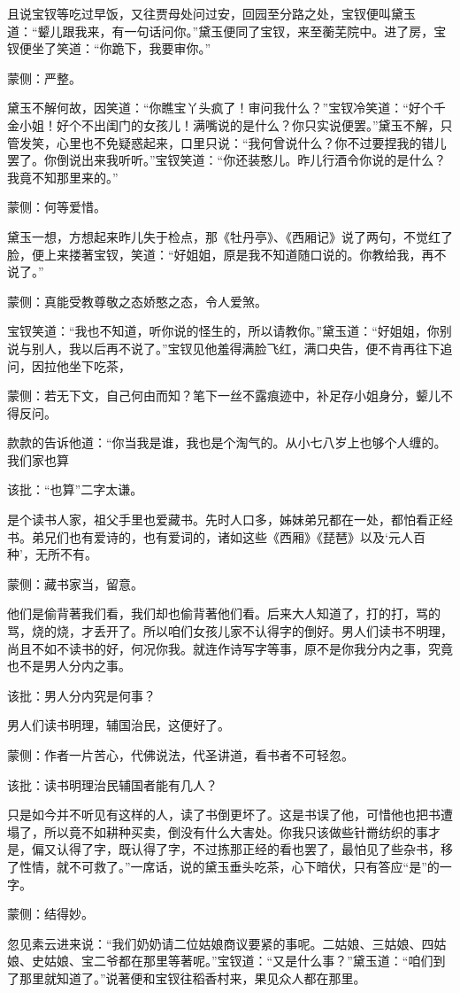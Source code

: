 \begin{parag}
    且说宝钗等吃过早饭，又往贾母处问过安，回园至分路之处，宝钗便叫黛玉道：“颦儿跟我来，有一句话问你。”黛玉便同了宝钗，来至蘅芜院中。进了房，宝钗便坐了笑道：“你跪下，我要审你。”\begin{note}蒙侧：严整。\end{note}黛玉不解何故，因笑道：“你瞧宝丫头疯了！审问我什么？”宝钗冷笑道：“好个千金小姐！好个不出闺门的女孩儿！满嘴说的是什么？你只实说便罢。”黛玉不解，只管发笑，心里也不免疑惑起来，口里只说：“我何曾说什么？你不过要捏我的错儿罢了。你倒说出来我听听。”宝钗笑道：“你还装憨儿。昨儿行酒令你说的是什么？我竟不知那里来的。”\begin{note}蒙侧：何等爱惜。\end{note}黛玉一想，方想起来昨儿失于检点，那《牡丹亭》、《西厢记》说了两句，不觉红了脸，便上来搂著宝钗，笑道：“好姐姐，原是我不知道随口说的。你教给我，再不说了。”\begin{note}蒙侧：真能受教尊敬之态娇憨之态，令人爱煞。\end{note}宝钗笑道：“我也不知道，听你说的怪生的，所以请教你。”黛玉道：“好姐姐，你别说与别人，我以后再不说了。”宝钗见他羞得满脸飞红，满口央告，便不肯再往下追问，因拉他坐下吃茶，\begin{note}蒙侧：若无下文，自己何由而知？笔下一丝不露痕迹中，补足存小姐身分，颦儿不得反问。\end{note}款款的告诉他道：“你当我是谁，我也是个淘气的。从小七八岁上也够个人缠的。我们家也算\begin{note}该批：“也算”二字太谦。\end{note}是个读书人家，祖父手里也爱藏书。先时人口多，姊妹弟兄都在一处，都怕看正经书。弟兄们也有爱诗的，也有爱词的，诸如这些《西厢》《琵琶》以及‘元人百种’，无所不有。\begin{note}蒙侧：藏书家当，留意。\end{note}他们是偷背著我们看，我们却也偷背著他们看。后来大人知道了，打的打，骂的骂，烧的烧，才丢开了。所以咱们女孩儿家不认得字的倒好。男人们读书不明理，尚且不如不读书的好，何况你我。就连作诗写字等事，原不是你我分内之事，究竟也不是男人分内之事。\begin{note}该批：男人分内究是何事？\end{note}男人们读书明理，辅国治民，这便好了。\begin{note}蒙侧：作者一片苦心，代佛说法，代圣讲道，看书者不可轻忽。\end{note}\begin{note}该批：读书明理治民辅国者能有几人？\end{note}只是如今并不听见有这样的人，读了书倒更坏了。这是书误了他，可惜他也把书遭塌了，所以竟不如耕种买卖，倒没有什么大害处。你我只该做些针黹纺织的事才是，偏又认得了字，既认得了字，不过拣那正经的看也罢了，最怕见了些杂书，移了性情，就不可救了。”一席话，说的黛玉垂头吃茶，心下暗伏，只有答应“是”的一字。\begin{note}蒙侧：结得妙。\end{note}忽见素云进来说：“我们奶奶请二位姑娘商议要紧的事呢。二姑娘、三姑娘、四姑娘、史姑娘、宝二爷都在那里等著呢。”宝钗道：“又是什么事？”黛玉道：“咱们到了那里就知道了。”说著便和宝钗往稻香村来，果见众人都在那里。
\end{parag}


